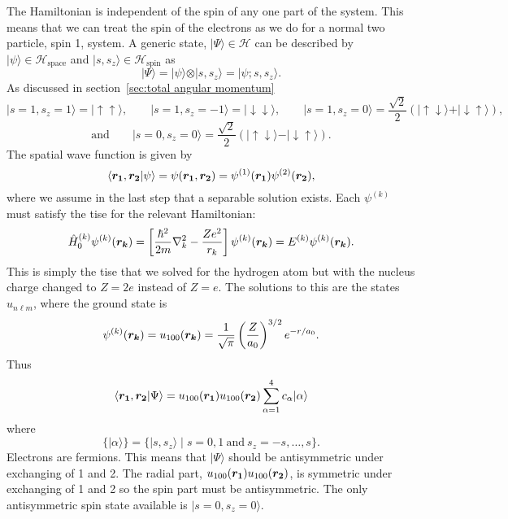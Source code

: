 \documentclass[a4paper]{article}
\renewcommand{\ket}[1]{\vert {#1} \rangle}
\renewcommand{\braket}[2]{\langle {#1} \vert {#2} \rangle}
\newcommand{\hilbert}{\mathcal{H}}
\newcommand{\st}{\mid}
\newcommand{\tensorProd}{\otimes}
\newcommand{\spinUp}{\uparrow}
\newcommand{\spinDown}{\downarrow}
\theoremstyle{definition}
\begin{document}
    The Hamiltonian is independent of the spin of any one part of the system.
    This means that we can treat the spin of the electrons as we do for a normal two particle, spin 1, system.
    A generic state, \(\ket{\Psi}\in \hilbert\) can be described by \(\ket{\psi}\in\hilbert_{\text{space}}\) and \(\ket{s, s_z}\in\hilbert_{\text{spin}}\) as
    \[\ket{\Psi} = \ket{\psi} \tensorProd \ket{s, s_z} = \ket{\psi; s, s_z}.\]
    As discussed in section~\ref{sec:total angular momentum}
    \[\ket{s=1, s_z=1} = \ket{\spinUp\spinUp}, \qquad \ket{s=1, s_z=-1} = \ket{\spinDown\spinDown}, \qquad\ket{s=1, s_z=0} = \frac{\sqrt{2}}{2}(\ket{\spinUp\spinDown} + \ket{\spinDown\spinUp}),\]
    \[\text{and}\qquad \ket{s=0, s_z=0} = \frac{\sqrt{2}}{2}(\ket{\spinUp\spinDown} - \ket{\spinDown\spinUp}).\]
    The spatial wave function is given by
    \[\braket{\vv{r_1}, \vv{r_2}}{\psi} = \psi(\vv{r_1}, \vv{r_2}) = \psi^{(1)}(\vv{r_1})\psi^{(2)}(\vv{r_2}),\]
    where we assume in the last step that a separable solution exists.
    Each \(\psi^{(k)}\) must satisfy the \gls{tise} for the relevant Hamiltonian:
    \[\hat{H}_0^{(k)}\psi^{(k)}(\bm{r_k}) = \left[\frac{\hbar^2}{2m}\nabla^2_k - \frac{Ze^2}{r_k}\right]\psi^{(k)}(\bm{r_k}) = E^{(k)}\psi^{(k)}(\bm{r_k}).\]
    This is simply the \gls{tise} that we solved for the hydrogen atom but with the nucleus charge changed to \(Z = 2e\) instead of \(Z = e\).
    The solutions to this are the states \(u_{n\ell m}\), where the ground state is
    \[\psi^{(k)}(\bm{r_k}) = u_{100}(\bm{r_k}) = \frac{1}{\sqrt{\pi}} \left(\frac{Z}{a_0}\right)^{3/2}e^{-r/a_0}.\]
    Thus
    \[\braket{\vv{r_1}, \vv{r_2}}{\Psi} = u_{100}(\vv{r_1})u_{100}(\vv{r_2})\sum_{\alpha = 1}^{4}c_\alpha\ket{\alpha}\]
    where
    \[\{\ket{\alpha}\} = \{\ket{s, s_z}\st s = 0, 1~\text{and}~s_z = -s, \dotsc, s\}.\]
    Electrons are fermions.
    This means that \(\ket{\Psi}\) should be antisymmetric under exchanging of 1 and 2.
    The radial part, \(u_{100}(\bm{r_1})u_{100}(\bm{r_2})\), is symmetric under exchanging of 1 and 2 so the spin part must be antisymmetric.
    The only antisymmetric spin state available is \(\ket{s = 0, s_z = 0}\).
    
\end{document}
